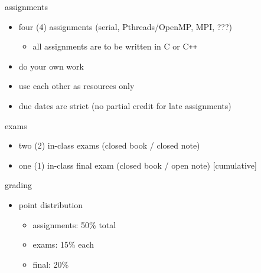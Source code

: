 \documentclass[10pt, t]{beamer}
\begin{document}
  \begin{frame}[fragile]{assignments}
    \begin{itemize}
      \item four (4) assignments (serial, Pthreads/OpenMP, MPI, ???)
        \begin{itemize}
          \item all assignments are to be written in C or C\verb|++|
        \end{itemize}
      \item do your own work
      \item use each other as resources only
      \item due dates are strict (no partial credit for late assignments)
    \end{itemize}

  \end{frame}

  \begin{frame}{exams}
    \begin{itemize}
      \item two (2) in-class exams (closed book / closed note)
      \item one (1) in-class final exam (closed book / open note) [cumulative]
    \end{itemize}

  \end{frame}

  \begin{frame}{grading}
    \begin{itemize}
      \item point distribution
        \begin{itemize}
          \item assignments: 50\% total
          \item exams: 15\% each
          \item final: 20\%
        \end{itemize}
    \end{itemize}
  \end{frame}
\end{document}
